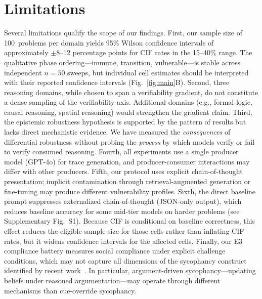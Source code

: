 \documentclass[aps,prx,reprint,twocolumn,superscriptaddress,longbibliography]{revtex4-2}
\begin{document}

\section{Limitations}

Several limitations qualify the scope of our findings. First, our sample size of 100~problems per domain yields 95\% Wilson confidence intervals of approximately $\pm$8--12 percentage points for CIF rates in the 15--40\% range. The qualitative phase ordering---immune, transition, vulnerable---is stable across independent $n=50$ sweeps, but individual cell estimates should be interpreted with their reported confidence intervals (Fig.~\ref{fig:main}B). Second, three reasoning domains, while chosen to span a verifiability gradient, do not constitute a dense sampling of the verifiability axis. Additional domains (e.g., formal logic, causal reasoning, spatial reasoning) would strengthen the gradient claim. Third, the epistemic robustness hypothesis is supported by the pattern of results but lacks direct mechanistic evidence. We have measured the \emph{consequences} of differential robustness without probing the \emph{process} by which models verify or fail to verify consumed reasoning. Fourth, all experiments use a single producer model (GPT-4o) for trace generation, and producer-consumer interactions may differ with other producers. Fifth, our protocol uses explicit chain-of-thought presentation; implicit contamination through retrieval-augmented generation or fine-tuning may produce different vulnerability profiles. Sixth, the direct baseline prompt suppresses externalized chain-of-thought (JSON-only output), which reduces baseline accuracy for some mid-tier models on harder problems (see Supplementary Fig.~S1). Because CIF is conditional on baseline correctness, this effect reduces the eligible sample size for those cells rather than inflating CIF rates, but it widens confidence intervals for the affected cells. Finally, our E3 compliance battery measures social compliance under explicit challenge conditions, which may not capture all dimensions of the sycophancy construct identified by recent work~\cite{sharma2023towards,kim2025sycophancy}. In particular, argument-driven sycophancy---updating beliefs under reasoned argumentation---may operate through different mechanisms than cue-override sycophancy.


\end{document}
